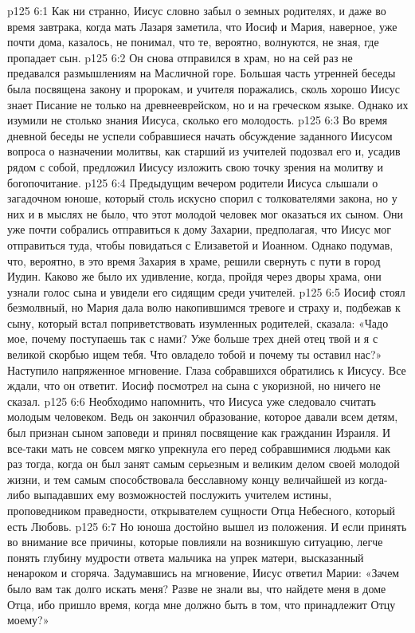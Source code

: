 \vs p125 6:1 Как ни странно, Иисус словно забыл о земных родителях, и даже во время завтрака, когда мать Лазаря заметила, что Иосиф и Мария, наверное, уже почти дома, казалось, не понимал, что те, вероятно, волнуются, не зная, где пропадает сын.
\vs p125 6:2 Он снова отправился в храм, но на сей раз не предавался размышлениям на Масличной горе. Большая часть утренней беседы была посвящена закону и пророкам, и учителя поражались, сколь хорошо Иисус знает Писание не только на древнееврейском, но и на греческом языке. Однако их изумили не столько знания Иисуса, сколько его молодость.
\vs p125 6:3 Во время дневной беседы не успели собравшиеся начать обсуждение заданного Иисусом вопроса о назначении молитвы, как старший из учителей подозвал его и, усадив рядом с собой, предложил Иисусу изложить свою точку зрения на молитву и богопочитание.
\vs p125 6:4 \pc Предыдущим вечером родители Иисуса слышали о загадочном юноше, который столь искусно спорил с толкователями закона, но у них и в мыслях не было, что этот молодой человек мог оказаться их сыном. Они уже почти собрались отправиться к дому Захарии, предполагая, что Иисус мог отправиться туда, чтобы повидаться с Елизаветой и Иоанном. Однако подумав, что, вероятно, в это время Захария в храме, решили свернуть с пути в город Иудин. Каково же было их удивление, когда, пройдя через дворы храма, они узнали голос сына и увидели его сидящим среди учителей.
\vs p125 6:5 Иосиф стоял безмолвный, но Мария дала волю накопившимся тревоге и страху и, подбежав к сыну, который встал поприветствовать изумленных родителей, сказала: «Чадо мое, почему поступаешь так с нами? Уже больше трех дней отец твой и я с великой скорбью ищем тебя. Что овладело тобой и почему ты оставил нас?» Наступило напряженное мгновение. Глаза собравшихся обратились к Иисусу. Все ждали, что он ответит. Иосиф посмотрел на сына с укоризной, но ничего не сказал.
\vs p125 6:6 \pc Необходимо напомнить, что Иисуса уже следовало считать молодым человеком. Ведь он закончил образование, которое давали всем детям, был признан сыном заповеди и принял посвящение как гражданин Израиля. И все\hyp{}таки мать не совсем мягко упрекнула его перед собравшимися людьми как раз тогда, когда он был занят самым серьезным и великим делом своей молодой жизни, и тем самым способствовала бесславному концу величайшей из когда\hyp{}либо выпадавших ему возможностей послужить учителем истины, проповедником праведности, открывателем сущности Отца Небесного, который есть Любовь.
\vs p125 6:7 Но юноша достойно вышел из положения. И если принять во внимание все причины, которые повлияли на возникшую ситуацию, легче понять глубину мудрости ответа мальчика на упрек матери, высказанный ненароком и сгоряча. Задумавшись на мгновение, Иисус ответил Марии: «Зачем было вам так долго искать меня? Разве не знали вы, что найдете меня в доме Отца, ибо пришло время, когда мне должно быть в том, что принадлежит Отцу моему?»

